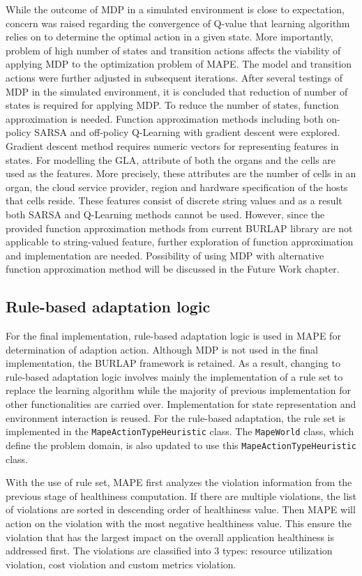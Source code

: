 \documentclass{seal_thesis}
\begin{document}
While the outcome of MDP in a simulated environment is close to expectation, concern was raised regarding the convergence of Q-value that learning algorithm relies on to determine the optimal action in a given state.
More importantly, problem of high number of states and transition actions affects the viability of applying MDP to the optimization problem of MAPE.
The model and transition actions were further adjusted in subsequent iterations.
After several testings of MDP in the simulated environment, it is concluded that reduction of number of states is required for applying MDP.
To reduce the number of states, function approximation is needed.
Function approximation methods including both on-policy SARSA and off-policy Q-Learning with gradient descent were explored.
Gradient descent method requires numeric vectors for representing features in states.
For modelling the GLA, attribute of both the organs and the cells are used as the features.
More precisely, these attributes are the number of cells in an organ, the cloud service provider, region and hardware specification of the hosts that cells reside.
These features consist of discrete string values and as a result both SARSA and Q-Learning methods cannot be used.
However, since the provided function approximation methods from current BURLAP library are not applicable to string-valued feature, further exploration of function approximation and implementation are needed.
Possibility of using MDP with alternative function approximation method will be discussed in the Future Work chapter.

\subsection{Rule-based adaptation logic}
For the final implementation, rule-based adaptation logic is used in MAPE for determination of adaption action. 
Although MDP is not used in the final implementation, the BURLAP framework is retained.
As a result, changing to rule-based adaptation logic involves mainly the implementation of a rule set to replace the learning algorithm while the majority of previous implementation for other functionalities are carried over.
Implementation for state representation and environment interaction is reused.
For the rule-based adaptation, the rule set is implemented in the \texttt{MapeActionTypeHeuristic} class.
The \texttt{MapeWorld} class, which define the problem domain, is also updated to use this \texttt{MapeActionTypeHeuristic} class.

With the use of rule set, MAPE first analyzes the violation information from the previous stage of healthiness computation.
If there are multiple violations, the list of violations are sorted in descending order of healthiness value.
Then MAPE will action on the violation with the most negative healthiness value.
This ensure the violation that has the largest impact on the overall application healthiness is addressed first.
The violations are classified into 3 types: resource utilization violation, cost violation and custom metrics violation.
\end{document}
